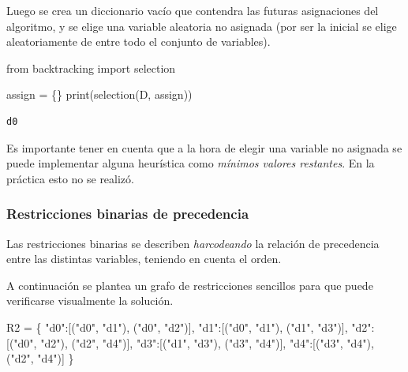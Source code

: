 \documentclass[
]{article}
\newenvironment{Shaded}{}{}
\newcommand{\BuiltInTok}[1]{#1}
\newcommand{\ImportTok}[1]{#1}
\newcommand{\NormalTok}[1]{#1}
\newcommand{\OperatorTok}[1]{\textcolor[rgb]{0.40,0.40,0.40}{#1}}
\newcommand{\StringTok}[1]{\textcolor[rgb]{0.25,0.44,0.63}{#1}}
\begin{document}
Luego se crea un diccionario vacío que contendra las futuras
asignaciones del algoritmo, y se elige una variable aleatoria no
asignada (por ser la inicial se elige aleatoriamente de entre todo el
conjunto de variables).

\begin{Shaded}
\begin{Highlighting}[]
\ImportTok{from}\NormalTok{ backtracking }\ImportTok{import}\NormalTok{ selection}

\NormalTok{assign }\OperatorTok{=}\NormalTok{ \{\}}
\BuiltInTok{print}\NormalTok{(selection(D, assign))}
\end{Highlighting}
\end{Shaded}

\begin{verbatim}
d0
\end{verbatim}

Es importante tener en cuenta que a la hora de elegir una variable no
asignada se puede implementar alguna heurística como \emph{mínimos
valores restantes}. En la práctica esto no se realizó.

\hypertarget{restricciones-binarias-de-precedencia}{%
\subsubsection{Restricciones binarias de
precedencia}\label{restricciones-binarias-de-precedencia}}

Las restricciones binarias se describen \emph{harcodeando} la relación
de precedencia entre las distintas variables, teniendo en cuenta el
orden.

A continuación se plantea un grafo de restricciones sencillos para que
puede verificarse visualmente la solución.

\begin{Shaded}
\begin{Highlighting}[]
\NormalTok{R2 }\OperatorTok{=}\NormalTok{ \{}
    \StringTok{"d0"}\NormalTok{:[(}\StringTok{"d0"}\NormalTok{, }\StringTok{"d1"}\NormalTok{), (}\StringTok{"d0"}\NormalTok{, }\StringTok{"d2"}\NormalTok{)],}
    \StringTok{"d1"}\NormalTok{:[(}\StringTok{"d0"}\NormalTok{, }\StringTok{"d1"}\NormalTok{), (}\StringTok{"d1"}\NormalTok{, }\StringTok{"d3"}\NormalTok{)],}
    \StringTok{"d2"}\NormalTok{:[(}\StringTok{"d0"}\NormalTok{, }\StringTok{"d2"}\NormalTok{), (}\StringTok{"d2"}\NormalTok{, }\StringTok{"d4"}\NormalTok{)],}
    \StringTok{"d3"}\NormalTok{:[(}\StringTok{"d1"}\NormalTok{, }\StringTok{"d3"}\NormalTok{), (}\StringTok{"d3"}\NormalTok{, }\StringTok{"d4"}\NormalTok{)],}
    \StringTok{"d4"}\NormalTok{:[(}\StringTok{"d3"}\NormalTok{, }\StringTok{"d4"}\NormalTok{), (}\StringTok{"d2"}\NormalTok{, }\StringTok{"d4"}\NormalTok{)]}
\NormalTok{\}}
\end{Highlighting}
\end{Shaded}
\end{document}
